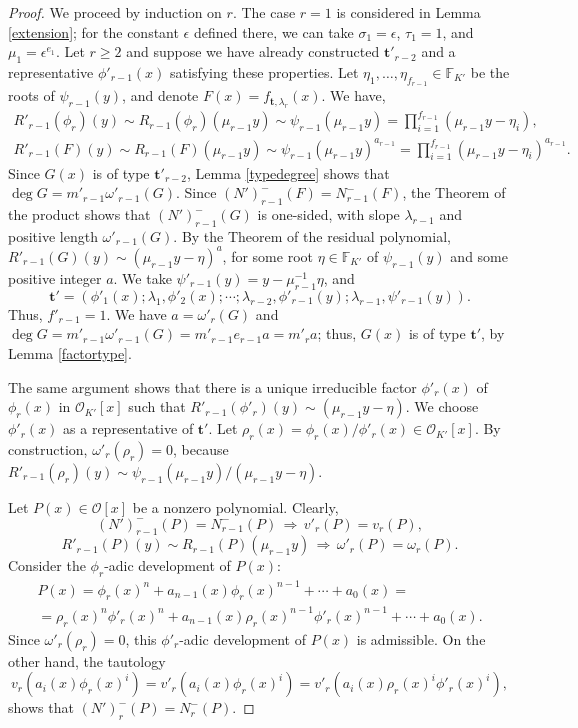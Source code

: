 \documentclass{amsart}
\def\op{\operatorname}
\def\as#1{\renewcommand\arraystretch{#1}}
\def\dg{\op{deg}}
\def\ff#1{\mathbb{F}_{#1}}
\def\imp{\,\Longrightarrow\,}
\def\la{\lambda}
\def\om{\omega}
\def\oo{{\mathcal O}}
\def\ty{\mathbf{t}}
\def\zpx{\oo[x]}
\begin{document}
\begin{proof}
We proceed by induction on $r$. The case $r=1$ is considered in Lemma \ref{extension}; for the constant $\epsilon$ defined there, we can take $\sigma_1=\epsilon$, $\tau_1=1$, and $\mu_1=\epsilon^{e_1}$. Let $r\ge 2$ and suppose we have already constructed $\ty'_{r-2}$ and a representative $\phi'_{r-1}(x)$ satisfying these properties.
Let $\eta_1,\dots,\eta_{f_{r-1}}\in \ff{K'}$ be the roots of $\psi_{r-1}(y)$, and denote $F(x)=f_{\ty,\la_r}(x)$. We have,
$$\as{1.4}
\begin{array}{l}
R'_{r-1}(\phi_r)(y)\sim R_{r-1}(\phi_r)(\mu_{r-1}y)\sim\psi_{r-1}(\mu_{r-1}y)=\prod_{i=1}^{f_{r-1}}(\mu_{r-1}y-\eta_i),\\
R'_{r-1}(F)(y)\sim R_{r-1}(F)(\mu_{r-1}y)\sim\psi_{r-1}(\mu_{r-1}y)^{a_{r-1}}=\prod_{i=1}^{f_{r-1}}(\mu_{r-1}y-\eta_i)^{a_{r-1}}.
\end{array}
$$
Since $G(x)$ is of type $\ty'_{r-2}$, Lemma \ref{typedegree} shows that $\dg G=m'_{r-1}\om'_{r-1}(G)$.
Since $(N')_{r-1}^-(F)=N_{r-1}^-(F)$, the Theorem of the product shows that $(N')_{r-1}^-(G)$ is one-sided, with slope $\la_{r-1}$ and positive length $\om'_{r-1}(G)$. By the Theorem of the residual polynomial, $R'_{r-1}(G)(y)\sim (\mu_{r-1}y-\eta)^a$, for some root $\eta\in\ff{K'}$ of $\psi_{r-1}(y)$ and some positive integer $a$.  We take
$\psi'_{r-1}(y)=y-\mu_{r-1}^{-1}\eta$, and
$$\ty'=(\phi'_1(x);\la_1,\phi'_2(x);\cdots;\la_{r-2},\phi'_{r-1}(y);\la_{r-1},\psi'_{r-1}(y)).$$ 
Thus, $f'_{r-1}=1$. We have $a=\om'_r(G)$ and $\dg G=m'_{r-1}\om'_{r-1}(G)=m'_{r-1}e_{r-1}a=m'_ra$; thus, $G(x)$ is of type $\ty'$, by Lemma \ref{factortype}. 

The same argument shows that there is a unique irreducible factor $\phi'_r(x)$ of $\phi_r(x)$ in $\oo_{K'}[x]$ such that $R'_{r-1}(\phi'_r)(y)\sim (\mu_{r-1}y-\eta)$. We choose $\phi'_r(x)$ as a representative of $\ty'$. Let $\rho_r(x)=\phi_r(x)/\phi'_r(x)\in\oo_{K'}[x]$. By construction, $\om'_r(\rho_r)=0$, because $R'_{r-1}(\rho_r)(y)\sim \psi_{r-1}(\mu_{r-1}y)/(\mu_{r-1}y-\eta)$.

Let $P(x)\in\zpx$ be a nonzero polynomial. Clearly, 
$$(N')_{r-1}^-(P)=N_{r-1}^-(P)\imp v'_r(P)=v_r(P),$$$$R'_{r-1}(P)(y)\sim R_{r-1}(P)(\mu_{r-1}y)\imp \om'_r(P)=\om_r(P).$$ 
 Consider the $\phi_r$-adic development of $P(x)$:
\begin{multline*}
P(x)=\phi_r(x)^n+a_{n-1}(x)\phi_r(x)^{n-1}+\cdots+a_0(x)=\\=\rho_r(x)^{n}\phi'_r(x)^n+a_{n-1}(x)\rho_r(x)^{n-1}\phi'_r(x)^{n-1}+\cdots+a_0(x).
\end{multline*}
Since $\om'_r(\rho_r)=0$, this $\phi'_r$-adic development of $P(x)$ is admissible. On the other hand, the tautology
$$
v_r(a_i(x)\phi_r(x)^i)=v'_r(a_i(x)\phi_r(x)^i)=v'_r(a_i(x)\rho_r(x)^i\phi'_r(x)^i),
$$shows that $(N')_r^-(P)=N_r^-(P)$. 


\end{proof}
\end{document}
